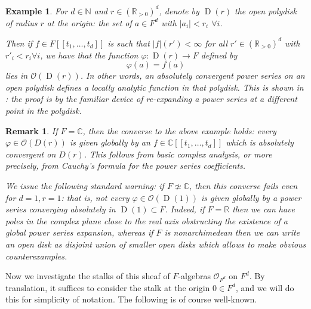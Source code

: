\documentclass[12pt]{article}
\newtheorem{example}[theorem]{Example}
\newtheorem{remark}[theorem]{Remark}
\begin{document}
\begin{example}
For $d\in\mathbb{N}$ and $r\in(\mathbb{R}_{>0})^d$, denote by $\operatorname{D}(r)$ the open polydisk of radius $r$ at the origin: the set of $a\in F^d$ with $|a_i|<r_i$ $\forall i$.

Then if $f\in F[[t_1,\ldots,t_d]]$ is such that $|f|(r')<\infty$ for all $r'\in (\mathbb{R}_{>0})^d$ with $r'_i<r_i \forall i$, we have that the function $\varphi:\operatorname{D}(r)\rightarrow F$ defined by
$$\varphi(a) = f(a)$$
lies in $\mathcal{O}(\operatorname{D}(r))$.  In other words, an absolutely convergent power series on an open polydisk defines a locally analytic function in that polydisk.  This is shown in \cite{SerreLie}: the proof is by the familiar device of re-expanding a power series at a different point in the polydisk.
\end{example}

\begin{remark}\label{Cisspecial}
If $F=\mathbb{C}$, then the converse to the above example holds: every $\varphi\in \mathcal{O}(D(r))$ is given globally by an $f\in \mathbb{C}[[t_1,\ldots,t_d]]$ which is absolutely convergent on $D(r)$.  This follows from basic complex analysis, or more precisely, from Cauchy's formula for the power series coefficients.

We issue the following standard warning: if $F\not\simeq \mathbb{C}$, then this converse fails even for $d=1,r=1$: that is, not every $\varphi\in \mathcal{O}(\operatorname{D}(1))$ is given globally by a power series converging absolutely in $\operatorname{D}(1)\subset F$. Indeed, if $F=\mathbb{R}$ then we can have poles in the complex plane close to the real axis obstructing the existence of a global power series expansion, whereas if $F$ is nonarchimedean then we can write an open disk as disjoint union of smaller open disks which allows to make obvious counterexamples.
\end{remark}

Now we investigate the stalks of this sheaf of $F$-algebras $\mathcal{O}_{F^d}$ on $F^d$.  By translation, it suffices to consider the stalk at the origin $0\in F^d$, and we will do this for simplicity of notation.  The following is of course well-known.
\end{document}
